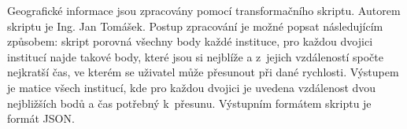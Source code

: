 \documentclass[thesis=M,czech]{FITthesis}[2012/06/26]
\begin{document}
      Geografické informace jsou zpracovány pomocí transformačního skriptu.
      Autorem skriptu je Ing. Jan Tomášek.
      Postup zpracování je možné popsat následujícím způsobem:
      skript porovná všechny body každé instituce,
      pro každou dvojici institucí najde takové body,
      které jsou si nejblíže a z~jejich vzdáleností spočte nejkratší čas, 
      ve kterém se uživatel může přesunout při dané rychlosti.
      Výstupem je matice všech institucí, 
      kde pro každou dvojici je uvedena vzdálenost dvou nejbližších bodů a čas potřebný k~přesunu.
      Výstupním formátem skriptu je formát JSON.
     
      






\end{document}
